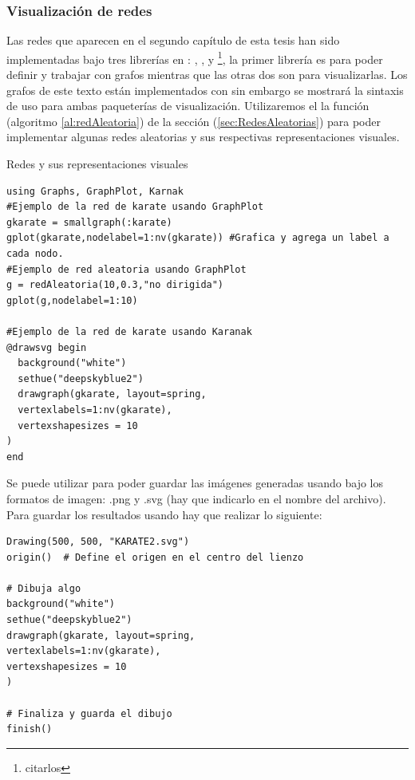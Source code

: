 \subsubsection{Visualización de redes}

Las redes que aparecen en el segundo capítulo de esta tesis han sido implementadas bajo tres librerías en \julia: \href{https://github.com/JuliaGraphs/Graphs.jl}{}, \href{https://github.com/JuliaGraphs/GraphPlot.jl}{}, y \href{https://github.com/cormullion/Karnak.jl}{}\footnote{citarlos}, la primer librería es para poder definir y trabajar con grafos mientras que las otras dos son para visualizarlas. Los grafos de este texto están implementados con  sin embargo se mostrará la sintaxis de uso para ambas paqueterías de visualización. Utilizaremos el la función  (algoritmo \ref{al:redAleatoria}) de la sección (\ref{sec:RedesAleatorias}) para poder implementar algunas redes aleatorias y sus respectivas representaciones visuales.
\begin{algorithm}
	\caption{Redes y sus representaciones visuales}
	\label{al:implementacionRedes}
	\begin{verbatim}
using Graphs, GraphPlot, Karnak
#Ejemplo de la red de karate usando GraphPlot
gkarate = smallgraph(:karate)
gplot(gkarate,nodelabel=1:nv(gkarate)) #Grafica y agrega un label a cada nodo.
#Ejemplo de red aleatoria usando GraphPlot
g = redAleatoria(10,0.3,"no dirigida")
gplot(g,nodelabel=1:10)

#Ejemplo de la red de karate usando Karanak
@drawsvg begin
  background("white")
  sethue("deepskyblue2")
  drawgraph(gkarate, layout=spring,
  vertexlabels=1:nv(gkarate),
  vertexshapesizes = 10
)
end
	\end{verbatim}
\end{algorithm}

\setlength{\parindent}{0cm} Se puede utilizar  para poder guardar las imágenes generadas usando  bajo los formatos de imagen: .png y .svg (hay que indicarlo en el nombre del archivo). Para guardar los resultados usando  hay que realizar lo siguiente:
\newpage
\begin{verbatim}
Drawing(500, 500, "KARATE2.svg")
origin()  # Define el origen en el centro del lienzo

# Dibuja algo
background("white")
sethue("deepskyblue2")
drawgraph(gkarate, layout=spring,
vertexlabels=1:nv(gkarate),
vertexshapesizes = 10
)

# Finaliza y guarda el dibujo
finish()
\end{verbatim}

